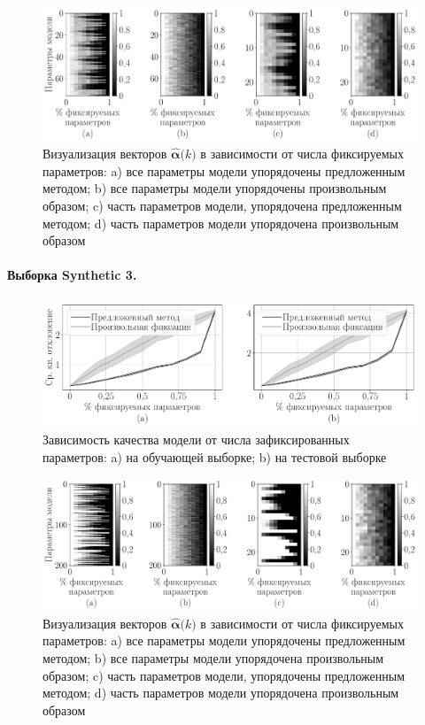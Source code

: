 \begin{figure}[h!t]\center
\includegraphics[width=1\textwidth]{results/order/boston_data_matshow}
\caption{Визуализация векторов $\hat{\bm{\alpha}}\bigr(k\bigr)$ в зависимости от числа фиксируемых параметров: a) все параметры модели упорядочены предложенным методом; b) все параметры модели упорядочены произвольным образом; c) часть параметров модели, упорядочена предложенным методом; d) часть параметров модели упорядочена произвольным образом}
\label{fg:ex:bost:2}
\end{figure}

\paragraph{Выборка Synthetic 3.}
\begin{figure}[h!t]\center
\includegraphics[width=1\textwidth]{results/order/generate_data_linear_loss}
\caption{Зависимость качества модели от числа зафиксированных параметров: a) на обучающей выборке; b) на тестовой выборке}
\label{fg:ex:syn1:1}
\end{figure}

\begin{figure}[h!t]\center
\includegraphics[width=1\textwidth]{results/order/generate_data_linear_matshow}
\caption{Визуализация векторов $\hat{\bm{\alpha}}\bigr(k\bigr)$ в зависимости от числа фиксируемых параметров: a) все параметры модели упорядочены предложенным методом; b) все параметры модели упорядочена произвольным образом; c) часть параметров модели, упорядочены предложенным методом; d) часть параметров модели упорядочена произвольным образом}
\label{fg:ex:syn1:2}
\end{figure}

